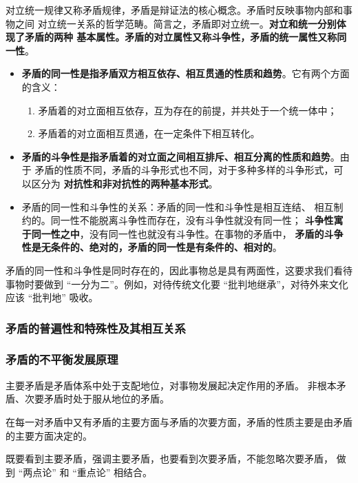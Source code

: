 \documentclass[10pt, UTF8]{book} %
\begin{document}
对立统一规律又称矛盾规律，矛盾是辩证法的核心概念。矛盾时反映事物内部和事物之间
对立统一关系的哲学范畴。简言之，矛盾即对立统一。\textbf{对立和统一分别体现了矛盾的两种
基本属性。矛盾的对立属性又称斗争性，矛盾的统一属性又称同一性}。
\begin{itemize}[itemsep=0pt]
    \item \textbf{矛盾的同一性是指矛盾双方相互依存、相互贯通的性质和趋势}。它有两个方面
    的含义：
    \begin{enumerate}[label={${\arabic*}^\circ$}, itemsep=0pt]
        \item 矛盾着的对立面相互依存，互为存在的前提，并共处于一个统一体中；
        \item 矛盾着的对立面相互贯通，在一定条件下相互转化。
    \end{enumerate}
    \item \textbf{矛盾的斗争性是指矛盾着的对立面之间相互排斥、相互分离的性质和趋势}。由于
    矛盾的性质不同，矛盾的斗争形式也不同，对于多种多样的斗争形式，可以区分为
    \textbf{对抗性和非对抗性的两种基本形式}。
    \item 矛盾的同一性和斗争性的关系：矛盾的同一性和斗争性是相互连结、
    相互制约的。同一性不能脱离斗争性而存在，没有斗争性就没有同一性；
    \textbf{斗争性寓于同一性之中}，没有同一性也就没有斗争性。在事物的矛盾中，
    \textbf{矛盾的斗争性是无条件的、绝对的，矛盾的同一性是有条件的、相对的}。
\end{itemize}
矛盾的同一性和斗争性是同时存在的，因此事物总是具有两面性，这要求我们看待
事物时要做到 “一分为二”。例如，对待传统文化要 “批判地继承”，对待外来文化应该
“批判地” 吸收。

\subsubsection{矛盾的普遍性和特殊性及其相互关系}
\subsubsection{矛盾的不平衡发展原理}

主要矛盾是矛盾体系中处于支配地位，对事物发展起决定作用的矛盾。
非根本矛盾、次要矛盾时处于服从地位的矛盾。

在每一对矛盾中又有矛盾的主要方面与矛盾的次要方面，矛盾的性质主要是由矛盾
的主要方面决定的。

既要看到主要矛盾，强调主要矛盾，也要看到次要矛盾，不能忽略次要矛盾，
做到 “两点论” 和 “重点论” 相结合。
\end{document}
